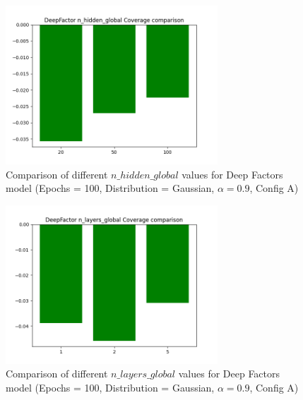 \begin{figure}[H]
    \centering
    \includegraphics[width=300px]{plots/hist/a/DeepFactor/n_hidden_global/Coverage.png}
    \caption{Comparison of different $n\_hidden\_global$ values for Deep Factors model (Epochs = 100, Distribution = Gaussian, $\alpha = 0.9$, Config A)}
    \label{fig:comp_deepfactor_n_hidden_globals}
\end{figure}

\begin{figure}[H]
    \centering
    \includegraphics[width=300px]{plots/hist/a/DeepFactor/n_layers_global/Coverage.png}
    \caption{Comparison of different $n\_layers\_global$ values for Deep Factors model (Epochs = 100, Distribution = Gaussian, $\alpha = 0.9$, Config A)}
    \label{fig:comp_deepfactor_n_layers_global}
\end{figure}

